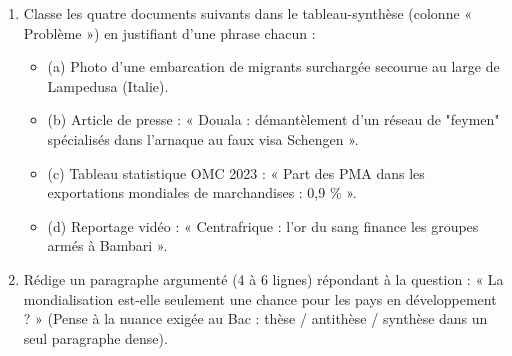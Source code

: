 \documentclass[11pt]{article}
\begin{document}
\begin{exercice}
\begin{enumerate}
\item Classe les quatre documents suivants dans le tableau-synthèse (colonne « Problème ») en justifiant d'une phrase chacun :
\begin{itemize}
\item (a) Photo d'une embarcation de migrants surchargée secourue au large de Lampedusa (Italie).
\item (b) Article de presse : « Douala : démantèlement d'un réseau de "feymen" spécialisés dans l'arnaque au faux visa Schengen ».
\item (c) Tableau statistique OMC 2023 : « Part des PMA dans les exportations mondiales de marchandises : 0,9 \% ».
\item (d) Reportage vidéo : « Centrafrique : l'or du sang finance les groupes armés à Bambari ».
\end{itemize}
\item Rédige un paragraphe argumenté (4 à 6 lignes) répondant à la question : « La mondialisation est-elle seulement une chance pour les pays en développement ? » (Pense à la nuance exigée au Bac : thèse / antithèse / synthèse dans un seul paragraphe dense).
\end{enumerate}
\end{exercice}
\end{document}
